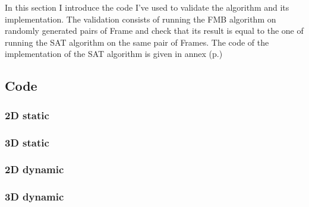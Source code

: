 \documentclass[12pt, a4paper]{article}
\begin{document}
In this section I introduce the code I've used to validate the algorithm and its implementation. The validation consists of running the FMB algorithm on randomly generated pairs of Frame and check that its result is equal to the one of running the SAT algorithm on the same pair of Frames. The code of the implementation of the SAT algorithm is given in annex (p.\pageref{sat_implementation})\\

\subsection{Code}

\subsubsection{2D static}

\begin{scriptsize}
\begin{ttfamily}

\end{ttfamily}
\end{scriptsize}

\subsubsection{3D static}

\begin{scriptsize}
\begin{ttfamily}

\end{ttfamily}
\end{scriptsize}

\subsubsection{2D dynamic}

\begin{scriptsize}
\begin{ttfamily}

\end{ttfamily}
\end{scriptsize}

\subsubsection{3D dynamic}

\begin{scriptsize}
\begin{ttfamily}

\end{ttfamily}
\end{scriptsize}
\end{document}
